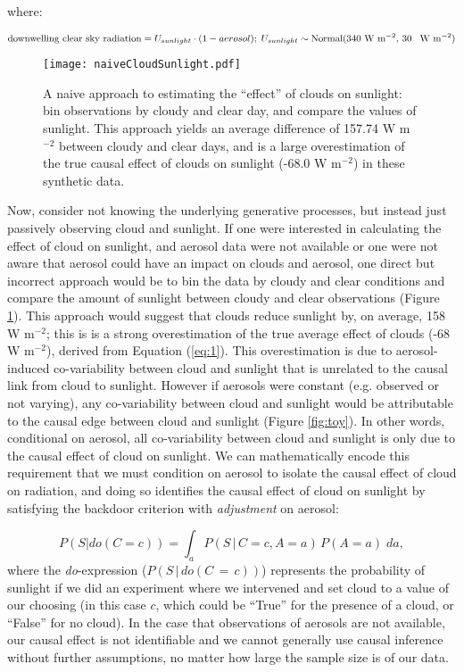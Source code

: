 \documentclass[12pt]{article}
\begin{document}
where:

\begin{equation*} \text{downwelling clear sky radiation} =
  U_{sunlight} \cdot (1 - aerosol); \; U_{sunlight} \sim
  \text{Normal(340 W m$^{-2}$, 30 \, W m$^{-2}$)}
\end{equation*}

\begin{figure} \centering \texttt{[image: naiveCloudSunlight.pdf]}
  \caption{A naive approach to estimating the ``effect'' of clouds on
    sunlight: bin observations by cloudy and clear day, and compare the
    values of sunlight. This approach yields an average difference of
    157.74 W m$^{-2}$ between cloudy and clear days, and is a large
    overestimation of the true causal effect of clouds on sunlight (-68.0
    W m$^{-2}$) in these synthetic data.}
  \label{fig:naive-cloud-sunlight}
\end{figure}

Now, consider not knowing the underlying generative processes, but
instead just passively observing cloud and sunlight. If one were
interested in calculating the effect of cloud on sunlight, and aerosol
data were not available or one were not aware that aerosol could have
an impact on clouds and aerosol, one direct but incorrect approach
would be to bin the data by cloudy and clear conditions and compare
the amount of sunlight between cloudy and clear observations (Figure
\ref{fig:naive-cloud-sunlight}). This approach would suggest that
clouds reduce sunlight by, on average, 158 W m$^{-2}$; this is is a
strong overestimation of the true average effect of clouds (-68 W
m$^{-2}$), derived from Equation (\ref{eq:1}). This overestimation is
due to aerosol-induced co-variability between cloud and sunlight that
is unrelated to the causal link from cloud to sunlight. However if
aerosols were constant (e.g. observed or not varying), any
co-variability between cloud and sunlight would be attributable to the
causal edge between cloud and sunlight (Figure \ref{fig:toy}). In
other words, conditional on aerosol, all co-variability between cloud
and sunlight is only due to the causal effect of cloud on sunlight.
We can mathematically encode this requirement that we must condition
on aerosol to isolate the causal effect of cloud on radiation, and
doing so identifies the causal effect of cloud on sunlight by
satisfying the backdoor criterion with \textit{adjustment} on aerosol:

\begin{equation} P(S | do(C = c)) = \int_{a} P(S \, | \, C = c, A=a)
  \, P(A=a) \; da,
  \label{eq:3}
\end{equation} where the \textit{do}-expression ($P(S \, | \, do(C\, = \,c))$) represents the probability of sunlight
if we did an experiment where we intervened and set cloud to a value
of our choosing (in this case $c$, which could be ``True'' for the
presence of a cloud, or ``False'' for no cloud). In the case that observations of aerosols are not available, our causal effect is not identifiable and
we cannot generally use causal inference without further assumptions,
no matter how large the sample size is of our data.
\end{document}
